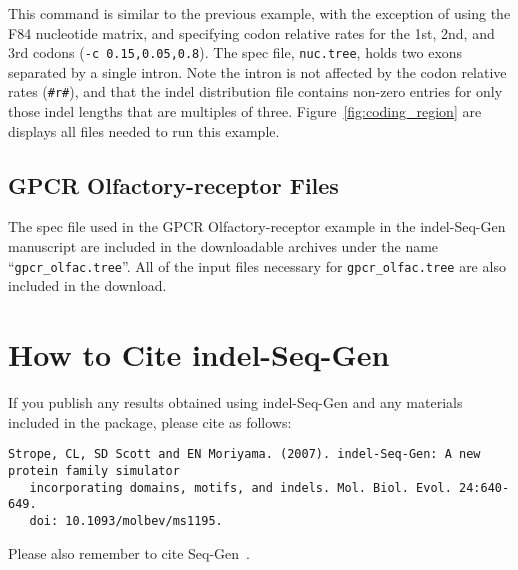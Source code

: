 \documentclass[10pt]{article}
\begin{document}
This command is similar to the previous example, with the exception of using the F84 nucleotide matrix,
and specifying codon relative rates for the 1st, 2nd, and 3rd codons ({\tt -c 0.15,0.05,0.8}). The spec
file, {\tt nuc.tree}, holds two exons separated by a single intron. Note the intron is not
affected by the codon relative rates ({\tt \#r\#}), and that the indel distribution file contains
non-zero entries for only those indel lengths that are multiples of three. Figure~\ref{fig:coding_region} are
displays all files needed to run this example.

\subsection{GPCR Olfactory-receptor Files}

The spec file used in the GPCR Olfactory-receptor example in the indel-Seq-Gen manuscript are
included in the downloadable archives under the name ``{\tt gpcr\_olfac.tree}''.  All of the
input files necessary for {\tt gpcr\_olfac.tree} are also included in the download.

\section{How to Cite indel-Seq-Gen}

If you publish any results obtained using indel-Seq-Gen and any materials included in the 
package, please cite as follows:

\begin{verbatim}
Strope, CL, SD Scott and EN Moriyama. (2007). indel-Seq-Gen: A new protein family simulator 
   incorporating domains, motifs, and indels. Mol. Biol. Evol. 24:640-649.
   doi: 10.1093/molbev/ms1195.
\end{verbatim}

Please also remember to cite Seq-Gen~\cite{Rambaut97}.

\newpage
\appendix
\end{document}
